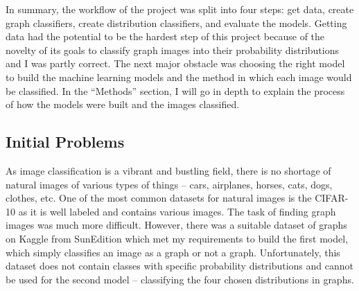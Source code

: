 \documentclass[12pt]{article}
\begin{document}
            In summary, the workflow of the project was split into four steps: 
            get data, create graph classifiers, create distribution classifiers, and evaluate the models. 
            Getting data had the potential to be the hardest step of this project 
            because of the novelty of its goals to classify graph images into their probability distributions 
            and I was partly correct. The next major obstacle was choosing the right model to build the machine learning models 
            and the method in which each image would be classified.  
            In the “Methods” section, I will go in depth to explain the process of how the models were built and the images classified.
        
        
        \subsection{Initial Problems}
        
            As image classification is a vibrant and bustling field, 
            there is no shortage of natural images of various types of things 
            -- cars, airplanes, horses, cats, dogs, clothes, etc. 
            One of the most common datasets for natural images is the CIFAR-10 \cite{ krizhevsky2009} 
            as it is well labeled and contains various images. The task of finding graph images was much more difficult. 
            However, there was a suitable dataset of graphs on Kaggle from SunEdition \cite{sunedition2021} 
            which met my requirements to build the first model, which simply classifies an image as a graph or not a graph. 
            Unfortunately, this dataset does not contain classes with specific probability distributions 
            and cannot be used for the second model -- classifying the four chosen distributions in graphs.
\end{document}
